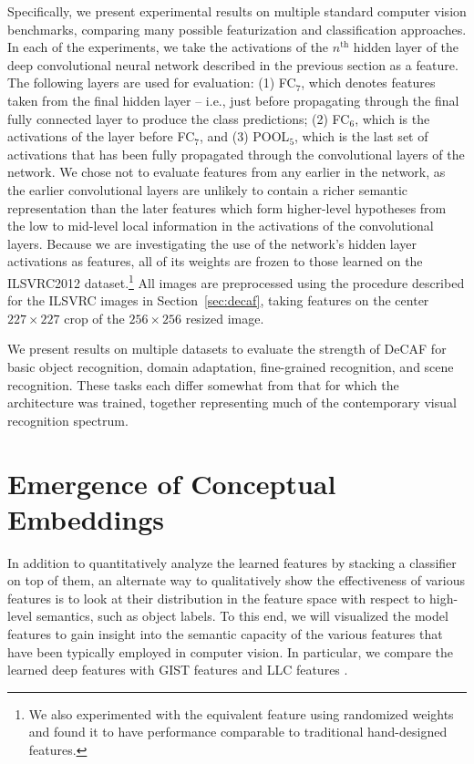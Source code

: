 Specifically, we present experimental results on multiple standard computer vision benchmarks, comparing many possible featurization and classification approaches.
In each of the experiments, we take the activations of the $n^{\mathrm{th}}$ hidden layer of the deep convolutional neural network described in the previous section as a feature. The following layers are used for evaluation:
(1) FC$_7$, which denotes features taken from the final hidden layer -- i.e., just before propagating through the final fully connected layer to produce the class predictions; (2) FC$_6$, which is the activations of the layer before FC$_7$, and (3) POOL$_5$, which is the last set of activations that has been fully propagated through the convolutional layers of the network.
We chose not to evaluate features from any earlier in the network, as the earlier convolutional layers are unlikely to contain a richer semantic representation than the later features which form higher-level hypotheses from the low to mid-level local information in the activations of the convolutional layers.
Because we are investigating the use of the network's hidden layer activations as features, all of its weights are frozen to those learned on the ILSVRC2012 dataset.\footnote{We also experimented with the equivalent feature using randomized weights and found it to have performance comparable to traditional hand-designed features.}
All images are preprocessed using the procedure described for the ILSVRC images in Section~\ref{sec:decaf}, taking features on the center $227 \times 227$ crop of the $256 \times 256$ resized image.

We present results on multiple datasets to evaluate the strength of DeCAF for basic object recognition, domain adaptation, fine-grained recognition, and scene recognition. These tasks each differ somewhat from that for which the architecture was trained, together representing much of the contemporary visual recognition spectrum.



\section{Emergence of Conceptual Embeddings}
In addition to quantitatively analyze the learned features by stacking a classifier on top of them, an alternate way to qualitatively show the effectiveness of various features is to look at their distribution in the feature space with respect to high-level semantics, such as object labels. To this end, we will visualized the model features to gain insight into the semantic capacity of the various features that have been typically employed in computer vision. In particular, we compare the learned deep features with GIST features \cite{gist} and LLC features \cite{llc}.

